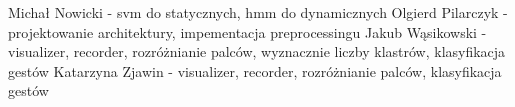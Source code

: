 {\color{red} Michał Nowicki - svm do statycznych, hmm do dynamicznych
Olgierd Pilarczyk - projektowanie architektury, impementacja preprocessingu
Jakub Wąsikowski - visualizer, recorder, rozróżnianie palców, wyznacznie liczby klastrów, klasyfikacja gestów
Katarzyna Zjawin - visualizer, recorder, rozróżnianie palców, klasyfikacja gestów}
